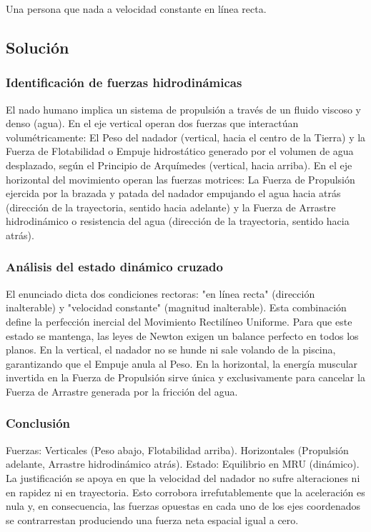 \documentclass[12pt, a4paper]{article}
\begin{document}
Una persona que nada a velocidad constante en línea recta.

\subsection*{Solución}

\subsubsection*{Identificación de fuerzas hidrodinámicas}
El nado humano implica un sistema de propulsión a través de un fluido viscoso y denso (agua).
En el eje vertical operan dos fuerzas que interactúan volumétricamente: El Peso del nadador (vertical, hacia el centro de la Tierra) y la Fuerza de Flotabilidad o Empuje hidrostático generado por el volumen de agua desplazado, según el Principio de Arquímedes (vertical, hacia arriba).
En el eje horizontal del movimiento operan las fuerzas motrices: La Fuerza de Propulsión ejercida por la brazada y patada del nadador empujando el agua hacia atrás (dirección de la trayectoria, sentido hacia adelante) y la Fuerza de Arrastre hidrodinámico o resistencia del agua (dirección de la trayectoria, sentido hacia atrás).

\subsubsection*{Análisis del estado dinámico cruzado}
El enunciado dicta dos condiciones rectoras: "en línea recta" (dirección inalterable) y "velocidad constante" (magnitud inalterable). Esta combinación define la perfección inercial del Movimiento Rectilíneo Uniforme. Para que este estado se mantenga, las leyes de Newton exigen un balance perfecto en todos los planos. En la vertical, el nadador no se hunde ni sale volando de la piscina, garantizando que el Empuje anula al Peso. En la horizontal, la energía muscular invertida en la Fuerza de Propulsión sirve única y exclusivamente para cancelar la Fuerza de Arrastre generada por la fricción del agua.

\subsubsection*{Conclusión}
Fuerzas: Verticales (Peso abajo, Flotabilidad arriba). Horizontales (Propulsión adelante, Arrastre hidrodinámico atrás).
Estado: Equilibrio en MRU (dinámico). La justificación se apoya en que la velocidad del nadador no sufre alteraciones ni en rapidez ni en trayectoria. Esto corrobora irrefutablemente que la aceleración es nula y, en consecuencia, las fuerzas opuestas en cada uno de los ejes coordenados se contrarrestan produciendo una fuerza neta espacial igual a cero.
\end{document}
